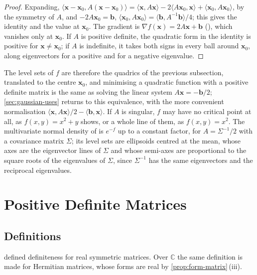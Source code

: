 \begin{proof}
Expanding, $\langle\mathbf x-\mathbf x_0,A(\mathbf x-\mathbf x_0)\rangle=\langle\mathbf x,A\mathbf x\rangle-2\langle A\mathbf x_0,\mathbf x\rangle+\langle\mathbf x_0,A\mathbf x_0\rangle$, by the symmetry of $A$, and $-2A\mathbf x_0=\mathbf b$, $\langle\mathbf x_0,A\mathbf x_0\rangle=\langle\mathbf b,A^{-1}\mathbf b\rangle/4$; this gives the identity and the value at $\mathbf x_0$. The gradient is $\nabla f(\mathbf x)=2A\mathbf x+\mathbf b$ (), which vanishes only at $\mathbf x_0$. If $A$ is positive definite, the quadratic form in the identity is positive for $\mathbf x\ne\mathbf x_0$; if $A$ is indefinite, it takes both signs in every ball around $\mathbf x_0$, along eigenvectors for a positive and for a negative eigenvalue.
\end{proof}

The level sets of $f$ are therefore the quadrics of the previous subsection, translated to the centre $\mathbf x_0$, and minimising a quadratic function with a positive definite matrix is the same as solving the linear system $A\mathbf x=-\mathbf b/2$; \cref{sec:gaussian-uses} returns to this equivalence, with the more convenient normalisation $\langle\mathbf x,A\mathbf x\rangle/2-\langle\mathbf b,\mathbf x\rangle$. If $A$ is singular, $f$ may have no critical point at all, as $f(x,y)=x^2+y$ shows, or a whole line of them, as $f(x,y)=x^2$. The multivariate normal density of  is $e^{-f}$ up to a constant factor, for $A=\Sigma^{-1}/2$ with a covariance matrix $\Sigma$; its level sets are ellipsoids centred at the mean, whose axes are the eigenvector lines of $\Sigma$ and whose semi-axes are proportional to the square roots of the eigenvalues of $\Sigma$, since $\Sigma^{-1}$ has the same eigenvectors and the reciprocal eigenvalues.

\section{Positive Definite Matrices}
\label{sec:positive-definite}

\subsection{Definitions}

 defined definiteness for real symmetric matrices. Over $\mathbb C$ the same definition is made for Hermitian matrices, whose forms are real by \cref{prop:form-matrix}\,(iii).

